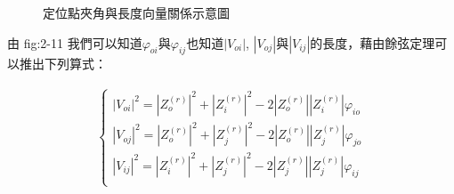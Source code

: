 	\begin{figure}
    \begin{center}
    \end{center}
    \caption{定位點夾角與長度向量關係示意圖}
    \label{fig:Localization Relationship}
    \end{figure}


	由 fig:2-11 我們可以知道$\varphi _{oi}$與$\varphi _{ij}$也知道$|V_{oi}|$, $|V_{oj}|$與$|V_{ij}|$的長度，藉由餘弦定理可以推出下列算式：
	
	\begin{align}
		\left\{
		\begin{array}{cccc}
		|V_{oi}|^2 = |Z_o^{(r)}|^2 + |Z_i^{(r)}|^2 - 2|Z_o^{(r)}||Z_i^{(r)}|\varphi _{io}\\
		|V_{oj}|^2 = |Z_o^{(r)}|^2 + |Z_j^{(r)}|^2 - 2|Z_o^{(r)}||Z_j^{(r)}|\varphi _{jo}\\
		|V_{ij}|^2 = |Z_i^{(r)}|^2 + |Z_j^{(r)}|^2 - 2|Z_j^{(r)}||Z_j^{(r)}|\varphi _{ij}\\
		\end{array}
		\right.
	\end{align}	
	
